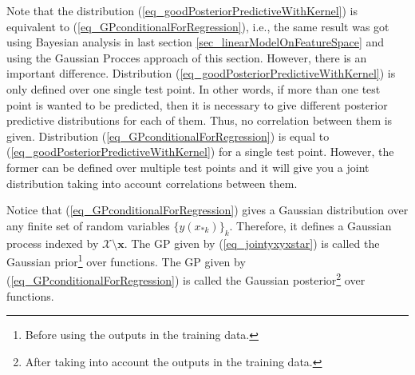 \begin{remark}
  Note that the distribution (\ref{eq_goodPosteriorPredictiveWithKernel}) is equivalent to (\ref{eq_GPconditionalForRegression}), i.e., the same result was got using Bayesian analysis in last section \ref{sec_linearModelOnFeatureSpace} and using the Gaussian Procces approach of this section. However, there is an important difference. Distribution (\ref{eq_goodPosteriorPredictiveWithKernel}) is only defined over one single test point. In other words, if more than one test point is wanted to be predicted, then it is necessary to give different posterior predictive distributions for each of them. Thus, no correlation between them is given. Distribution (\ref{eq_GPconditionalForRegression}) is equal to (\ref{eq_goodPosteriorPredictiveWithKernel}) for a single test point. However, the former can be defined over multiple test points and it will give you a joint distribution taking into account correlations between them.
\end{remark}

  Notice that (\ref{eq_GPconditionalForRegression}) gives a Gaussian distribution over any finite set of random variables $\{y(x_{*k})\}_k$. Therefore, it defines a Gaussian process indexed by $\mathcal{X} \setminus \pmb{x}$. The GP given by (\ref{eq_jointyxyxstar}) is called the Gaussian prior\footnote{Before using the outputs in the training data.} over functions. The GP given by (\ref{eq_GPconditionalForRegression}) is called the Gaussian posterior\footnote{After taking into account the outputs in the training data.} over functions.






